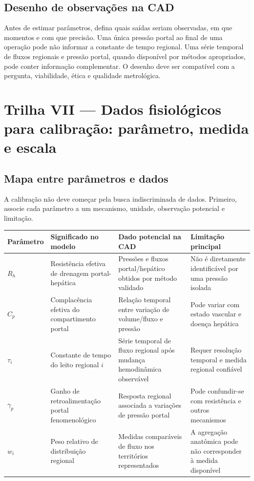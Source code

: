 \documentclass[11pt,a4paper,oneside]{book}
\begin{document}
\section{Desenho de observações na CAD}
Antes de estimar parâmetros, defina quais saídas seriam observadas, em que momentos e com que precisão. Uma única pressão portal ao final de uma operação pode não informar a constante de tempo regional. Uma série temporal de fluxos regionais e pressão portal, quando disponível por métodos apropriados, pode conter informação complementar. O desenho deve ser compatível com a pergunta, viabilidade, ética e qualidade metrológica.

\chapter{Trilha VII — Dados fisiológicos para calibração: parâmetro, medida e escala}

\section{Mapa entre parâmetros e dados}
A calibração não deve começar pela busca indiscriminada de dados. Primeiro, associe cada parâmetro a um mecanismo, unidade, observação potencial e limitação.

\begin{longtable}{p{}p{}p{}p{}}
\toprule
\textbf{Parâmetro} & \textbf{Significado no modelo} & \textbf{Dado potencial na CAD} & \textbf{Limitação principal}\\
\midrule
$R_h$ & Resistência efetiva de drenagem portal-hepática & Pressões e fluxos portal/hepático obtidos por método validado & Não é diretamente identificável por uma pressão isolada\\
$C_p$ & Complacência efetiva do compartimento portal & Relação temporal entre variação de volume/fluxo e pressão & Pode variar com estado vascular e doença hepática\\
$\tau_i$ & Constante de tempo do leito regional $i$ & Série temporal de fluxo regional após mudança hemodinâmica observável & Requer resolução temporal e medida regional confiável\\
$\gamma_p$ & Ganho de retroalimentação portal fenomenológico & Resposta regional associada a variações de pressão portal & Pode confundir-se com resistência e outros mecanismos\\
$w_i$ & Peso relativo de distribuição regional & Medidas comparáveis de fluxo nos territórios representados & A agregação anatômica pode não corresponder à medida disponível\\
\bottomrule
\end{longtable}
\end{document}

